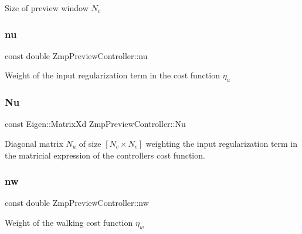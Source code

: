 Size of preview window $ N_c $ \hypertarget{classZmpPreviewController_ac611f084023404faba1ccfab573cd81d}{}\label{classZmpPreviewController_ac611f084023404faba1ccfab573cd81d} 
\subsubsection{\texorpdfstring{nu}{nu}}
{\footnotesize\ttfamily const double Zmp\+Preview\+Controller\+::nu\hspace{0.3cm}{\ttfamily [private]}}

Weight of the input regularization term in the cost function $\eta_u$ \hypertarget{classZmpPreviewController_ac3e92145988993ede7ce2060b997c8db}{}\label{classZmpPreviewController_ac3e92145988993ede7ce2060b997c8db} 
\subsubsection{\texorpdfstring{Nu}{Nu}}
{\footnotesize\ttfamily const Eigen\+::\+Matrix\+Xd Zmp\+Preview\+Controller\+::\+Nu\hspace{0.3cm}{\ttfamily [private]}}

Diagonal matrix $N_u$ of size $[N_c \times N_c]$ weighting the input regularization term in the matricial expression of the controller\textquotesingle{}s cost function. \hypertarget{classZmpPreviewController_a783427b817d77469e1f80426bede5310}{}\label{classZmpPreviewController_a783427b817d77469e1f80426bede5310} 
\subsubsection{\texorpdfstring{nw}{nw}}
{\footnotesize\ttfamily const double Zmp\+Preview\+Controller\+::nw\hspace{0.3cm}{\ttfamily [private]}}

Weight of the walking cost function $ \eta_w $ \hypertarget{classZmpPreviewController_a5e85354a1a7c3f2a8e265dbe7367051c}{}\label{classZmpPreviewController_a5e85354a1a7c3f2a8e265dbe7367051c} 
